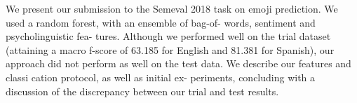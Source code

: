 We present our submission to the Semeval 2018 task on emoji prediction. We used a random forest, with an ensemble of bag-of- words, sentiment and psycholinguistic fea- tures. Although we performed well on the trial dataset (attaining a macro f-score of 63.185 for English and 81.381 for Spanish), our approach did not perform as well on the test data. We describe our features and classi cation protocol, as well as initial ex- periments, concluding with a discussion of the discrepancy between our trial and test results.
